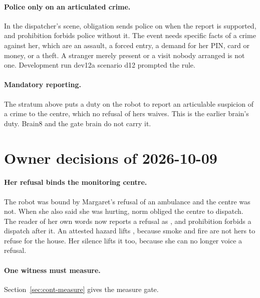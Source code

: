 \paragraph{Police only on an articulated crime.} In the dispatcher's scene, obligation  sends
police on  when the report is supported, and prohibition  forbids
police without it. The event needs specific facts of a crime against her, which are an assault, a
forced entry, a demand for her PIN, card or money, or a theft. A stranger merely present or a visit
nobody arranged is not one. Development run dev12a scenario d12 prompted the rule.

\paragraph{Mandatory reporting.} The  stratum above puts a duty on the robot to
report an articulable suspicion of a crime to the centre, which no refusal of hers waives. This is
the earlier brain's duty. Brain8 and the gate brain do not carry it.

\section{Owner decisions of 2026-10-09}\label{sec:cont-owner-1009}

\paragraph{Her refusal binds the monitoring centre.} The robot was bound by Margaret's refusal of
an ambulance and the centre was not.
When she also said she was hurting, norm  obliged the centre to dispatch.
The reader of her own words now reports a refusal as , and
prohibition  forbids a dispatch after it.
An attested hazard lifts , because smoke and fire are not hers to refuse for the house.
Her silence lifts it too, because she can no longer voice a refusal.

\paragraph{One witness must measure.} Section~\ref{sec:cont-measure} gives the measure gate.

